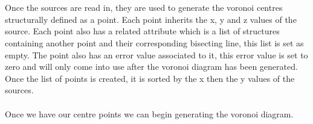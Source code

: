 \\
\\
Once the sources are read in, they are used to generate the voronoi centres structurally defined as a point. Each point inherits the x, y and z values of the source. Each point also has a related attribute which is a list of structures containing another point and their corresponding bisecting line, this list is set as empty. The point also has an error value associated to it, this error value is set to zero and will only come into use after the voronoi diagram has been generated. Once the list of points is created, it is sorted by the x then the y values of the sources.
\\
\\
Once we have our centre points we can begin generating the voronoi diagram. 